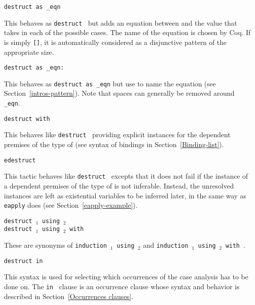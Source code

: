 \begin{coq_example*}
\begin{Variants}

\item{\tt destruct {\term} as {\disjconjintropattern} \_eqn}

  This behaves as {\tt destruct {\term}} but adds an equation between
  {\term} and the value that {\term} takes in each of the possible
  cases.  The name of the equation is chosen by Coq. If
  {\disjconjintropattern} is simply {\tt []}, it is automatically considered
  as a disjunctive pattern of the appropriate size.

\item{\tt destruct {\term} as {\disjconjintropattern} \_eqn: {\namingintropattern}}

  This behaves as {\tt destruct {\term} as
    {\disjconjintropattern} \_eqn} but use {\namingintropattern} to
  name the equation (see Section~\ref{intros-pattern}). Note that spaces
  can generally be removed around {\tt \_eqn}.

\item{\tt destruct {\term} with \bindinglist}

  This behaves like \texttt{destruct {\term}} providing explicit
  instances for the dependent premises of the type of {\term} (see
  syntax of bindings in Section~\ref{Binding-list}).

\item{\tt edestruct {\term}}

  This tactic behaves like \texttt{destruct {\term}} excepts that it
  does not fail if the instance of a dependent premises of the type of
  {\term} is not inferable. Instead, the unresolved instances are left
  as existential variables to be inferred later, in the same way as
  {\tt eapply} does (see Section~\ref{eapply-example}).

\item{\tt destruct {\term$_1$} using {\term$_2$}}\\
     {\tt destruct {\term$_1$} using {\term$_2$} with {\bindinglist}}

  These are synonyms of {\tt induction {\term$_1$} using {\term$_2$}} and
  {\tt induction {\term$_1$} using {\term$_2$} with {\bindinglist}}.

\item \texttt{destruct {\term} in {\occgoalset}}

  This syntax is used for selecting which occurrences of {\term} the
  case analysis has to be done on. The {\tt in {\occgoalset}} clause is an
  occurrence clause whose syntax and behavior is described in
  Section~\ref{Occurrences clauses}.


\end{Variants}
\end{coq_example*}
